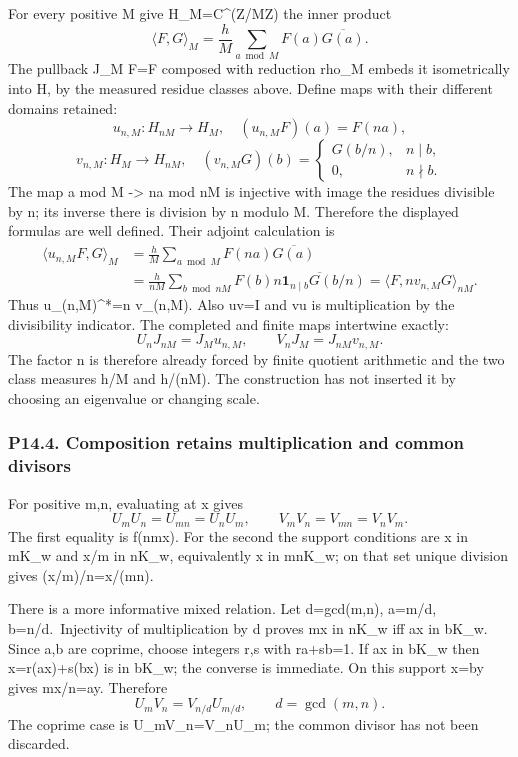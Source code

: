 \documentclass[
  11pt,
]{article}
\begin{document}
For every positive M give H\_M=C\^{}(Z/MZ) the inner product \[
\langle F,G\rangle_M=\frac hM\sum_{a\bmod M}F(a)\overline{G(a)}.
\tag{P14.6}
\] The pullback J\_M F=F composed with reduction rho\_M embeds it
isometrically into H, by the measured residue classes above. Define maps
with their different domains retained: \[
u_{n,M}:H_{nM}\to H_M,\quad (u_{n,M}F)(a)=F(na),
\] \[
v_{n,M}:H_M\to H_{nM},\quad
(v_{n,M}G)(b)=\begin{cases}G(b/n),& n\mid b,\\0,&n\nmid b.\end{cases}
\tag{P14.7}
\] The map a mod M -\textgreater{} na mod nM is injective with image the
residues divisible by n; its inverse there is division by n modulo M.
Therefore the displayed formulas are well defined. Their adjoint
calculation is \[
\begin{aligned}
\langle u_{n,M}F,G\rangle_M
&=\frac hM\sum_{a\bmod M}F(na)\overline{G(a)}\\
&=\frac h{nM}\sum_{b\bmod nM}F(b)
\overline{n\mathbf1_{n\mid b}G(b/n)}
=\langle F,nv_{n,M}G\rangle_{nM}.
\end{aligned}
\tag{P14.8}
\] Thus u\_(n,M)\^{}*=n v\_(n,M). Also uv=I and vu is multiplication by
the divisibility indicator. The completed and finite maps intertwine
exactly: \[
U_nJ_{nM}=J_Mu_{n,M},\qquad V_nJ_M=J_{nM}v_{n,M}.
\tag{P14.9}
\] The factor n is therefore already forced by finite quotient
arithmetic and the two class measures h/M and h/(nM). The construction
has not inserted it by choosing an eigenvalue or changing scale.

\subsubsection{P14.4. Composition retains multiplication and common
divisors}\label{p14.4.-composition-retains-multiplication-and-common-divisors}

For positive m,n, evaluating at x gives \[
U_mU_n=U_{mn}=U_nU_m,\qquad
V_mV_n=V_{mn}=V_nV_m.
\tag{P14.10}
\] The first equality is f(nmx). For the second the support conditions
are x in mK\_w and x/m in nK\_w, equivalently x in mnK\_w; on that set
unique division gives (x/m)/n=x/(mn).

There is a more informative mixed relation. Let d=gcd(m,n), a=m/d,
b=n/d.~Injectivity of multiplication by d proves mx in nK\_w iff ax in
bK\_w. Since a,b are coprime, choose integers r,s with ra+sb=1. If ax in
bK\_w then x=r(ax)+s(bx) is in bK\_w; the converse is immediate. On this
support x=by gives mx/n=ay. Therefore \[
\boxed{U_mV_n=V_{n/d}U_{m/d},\qquad d=\gcd(m,n).}
\tag{P14.11}
\] The coprime case is U\_mV\_n=V\_nU\_m; the common divisor has not
been discarded.
\end{document}
